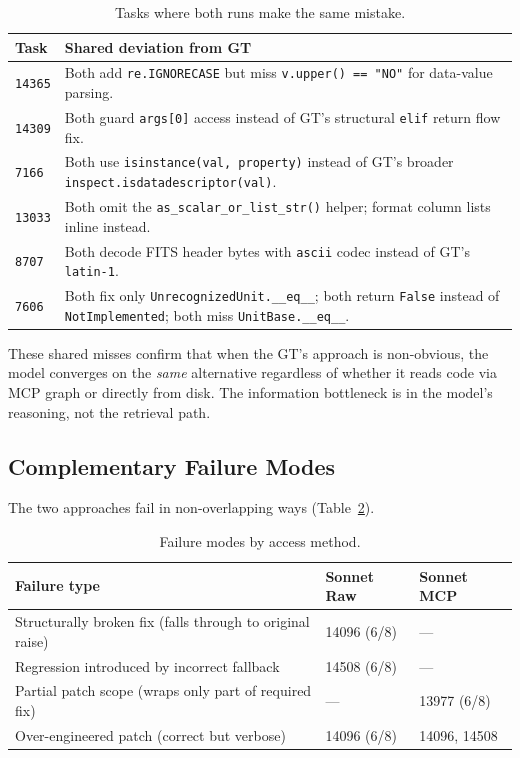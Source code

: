 \begin{table}[h]
\centering
\caption{Tasks where both runs make the same mistake.}\label{tab:shared-fail-sonnet}
\begin{tabular}{lp{9cm}}
\toprule
\textbf{Task} & \textbf{Shared deviation from GT} \\
\midrule
\texttt{14365} & Both add \texttt{re.IGNORECASE} but miss \texttt{v.upper() == "NO"} for data-value parsing. \\
\texttt{14309} & Both guard \texttt{args[0]} access instead of GT's structural \texttt{elif} return flow fix. \\
\texttt{7166}  & Both use \texttt{isinstance(val, property)} instead of GT's broader \texttt{inspect.isdatadescriptor(val)}. \\
\texttt{13033} & Both omit the \texttt{as\_scalar\_or\_list\_str()} helper; format column lists inline instead. \\
\texttt{8707}  & Both decode FITS header bytes with \texttt{ascii} codec instead of GT's \texttt{latin-1}. \\
\texttt{7606}  & Both fix only \texttt{UnrecognizedUnit.\_\_eq\_\_}; both return \texttt{False} instead of \texttt{NotImplemented}; both miss \texttt{UnitBase.\_\_eq\_\_}. \\
\bottomrule
\end{tabular}
\end{table}

\noindent
These shared misses confirm that when the GT's approach is non-obvious,
the model converges on the \emph{same} alternative regardless of whether
it reads code via MCP graph or directly from disk.
The information bottleneck is in the model's reasoning, not the
retrieval path.

\subsection{Complementary Failure Modes}\label{sec:complementary-sonnet}

The two approaches fail in non-overlapping ways
(Table~\ref{tab:fail-modes-sonnet}).

\begin{table}[h]
\centering
\caption{Failure modes by access method.}\label{tab:fail-modes-sonnet}
\begin{tabular}{lll}
\toprule
\textbf{Failure type} & \textbf{Sonnet Raw} & \textbf{Sonnet MCP} \\
\midrule
Structurally broken fix (falls through to original raise) & 14096 (6/8) & --- \\
Regression introduced by incorrect fallback              & 14508 (6/8) & --- \\
Partial patch scope (wraps only part of required fix)    & ---          & 13977 (6/8) \\
Over-engineered patch (correct but verbose)              & 14096 (6/8) & 14096, 14508 \\
\bottomrule
\end{tabular}
\end{table}

